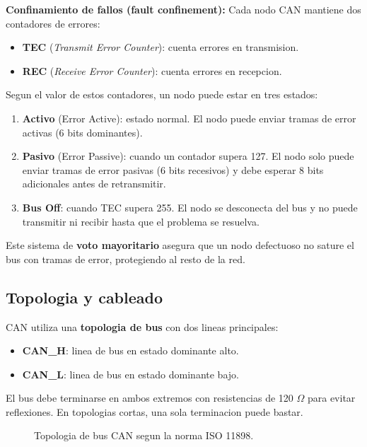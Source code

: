 \textbf{Confinamiento de fallos (fault confinement):}
Cada nodo CAN mantiene dos contadores de errores:
\begin{itemize}
    \item \textbf{TEC} (\textit{Transmit Error Counter}): cuenta errores en
    transmision.
    \item \textbf{REC} (\textit{Receive Error Counter}): cuenta errores en
    recepcion.
\end{itemize}

Segun el valor de estos contadores, un nodo puede estar en tres estados:
\begin{enumerate}
    \item \textbf{Activo} (Error Active): estado normal. El nodo puede enviar
    tramas de error activas (6 bits dominantes).
    \item \textbf{Pasivo} (Error Passive): cuando un contador supera 127. El nodo
    solo puede enviar tramas de error pasivas (6 bits recesivos) y debe esperar
    8 bits adicionales antes de retransmitir.
    \item \textbf{Bus Off}: cuando TEC supera 255. El nodo se desconecta del bus
    y no puede transmitir ni recibir hasta que el problema se resuelva.
\end{enumerate}

Este sistema de \textbf{voto mayoritario} asegura que un nodo defectuoso no
sature el bus con tramas de error, protegiendo al resto de la red.

\subsection{Topologia y cableado}

CAN utiliza una \textbf{topologia de bus} con dos lineas principales:

\begin{itemize}
    \item \textbf{CAN\_H}: linea de bus en estado dominante alto.
    \item \textbf{CAN\_L}: linea de bus en estado dominante bajo.
\end{itemize}

El bus debe terminarse en ambos extremos con resistencias de 120 $\Omega$ para
evitar reflexiones. En topologias cortas, una sola terminacion puede bastar.

\begin{figure}[H]
    \centering
    \caption{Topologia de bus CAN segun la norma ISO 11898.}
    \label{fig:can_topologia}
\end{figure}

